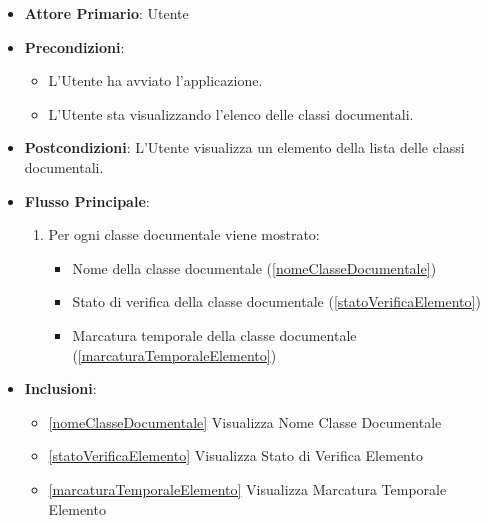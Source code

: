 \begin{itemize}
    \item \textbf{Attore Primario}: Utente
    \item \textbf{Precondizioni}: 
    \begin{itemize}
        \item L'Utente ha avviato l'applicazione.
        \item L'Utente sta visualizzando l'elenco delle classi documentali.
    \end{itemize}
    \item \textbf{Postcondizioni}: L'Utente visualizza un elemento della lista delle classi documentali.
    \item \textbf{Flusso Principale}:
    \begin{enumerate}
        \item Per ogni classe documentale viene mostrato:
        \begin{itemize}
            \item Nome della classe documentale (\ref{nomeClasseDocumentale})
            \item Stato di verifica della classe documentale (\ref{statoVerificaElemento})
            \item Marcatura temporale della classe documentale (\ref{marcaturaTemporaleElemento})
        \end{itemize}
    \end{enumerate}
    \item \textbf{Inclusioni}:
    \begin{itemize}
        \item \ref{nomeClasseDocumentale} Visualizza Nome Classe Documentale
        \item \ref{statoVerificaElemento} Visualizza Stato di Verifica Elemento
        \item \ref{marcaturaTemporaleElemento} Visualizza Marcatura Temporale Elemento
    \end{itemize}
\end{itemize}

